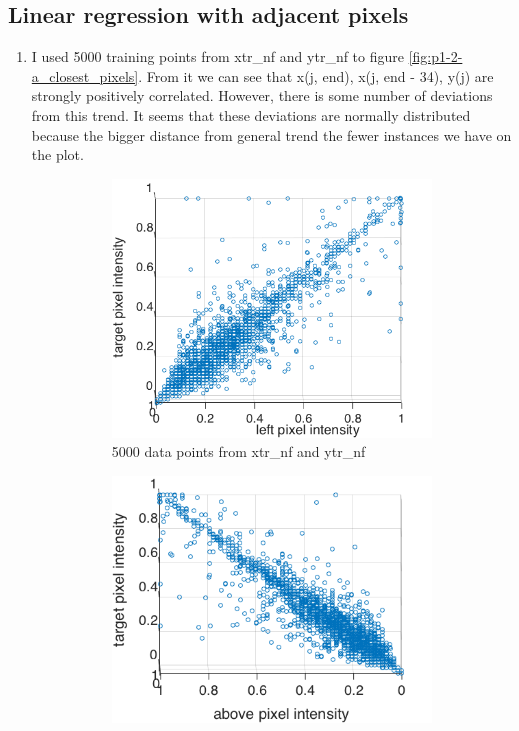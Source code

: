 \documentclass{article}
\begin{document}
		\subsection{Linear regression with adjacent pixels}
			\begin{enumerate}[label=(\alph*)]
				\item
					I used 5000 training points from xtr\_nf and ytr\_nf to figure \ref{fig:p1-2-a_closest_pixels}. From it we can see that x(j, end), x(j, end - 34), y(j) are strongly positively correlated. However, there is some  number of deviations from this trend. It seems that these deviations are normally distributed because the bigger distance from general trend the fewer instances we have on the plot. \\
				 	\begin{figure}[htbp]
				 		\caption{}
				 		\begin{subfigure}{0.5\textwidth}
				 			\includegraphics[width=\linewidth]{images/p1-2-a_left_target.png}
				 			\caption{5000 data points from xtr\_nf and ytr\_nf}
				 			\label{fig:p1-2-a_left_target}
				 		\end{subfigure}
				 		\begin{subfigure}{0.5\textwidth}
				 			\includegraphics[width=\linewidth]{images/p1-2-a_above_target.png}

\end{subfigure}
\end{figure}
\end{enumerate}
\end{document}
